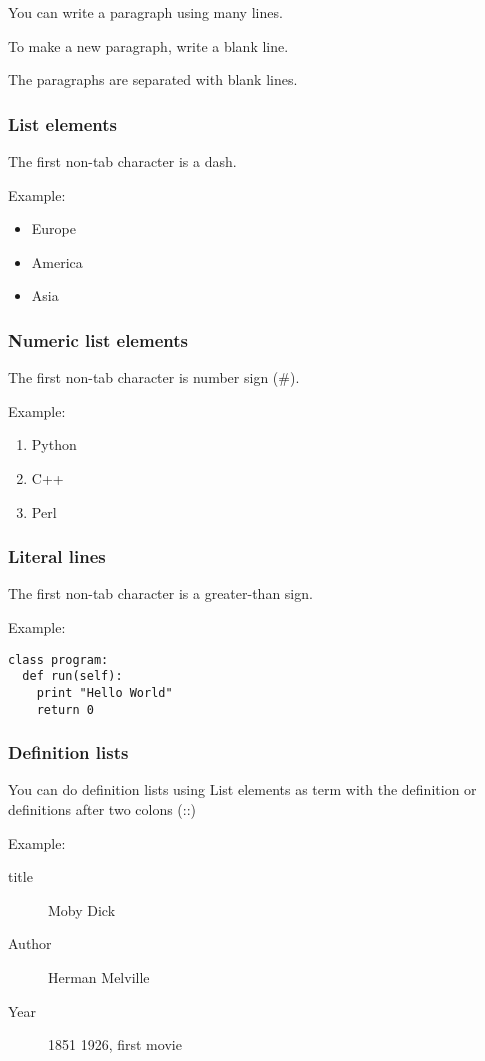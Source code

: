 \documentclass[a4paper,11pt]{article}
\begin{document}
You can write a paragraph using many lines. 

To make a new paragraph, write a blank line.

The paragraphs are separated with blank lines.

\subsubsection{List elements}
The first non-tab character is a dash.

Example:

\begin{itemize}
\item  Europe
\item  America
\item  Asia
\end{itemize}
\subsubsection{Numeric list elements}
The first non-tab character is number sign (#).

Example:

\begin{enumerate}
\item  Python
\item  C++
\item  Perl
\end{enumerate}
\subsubsection{Literal lines}
The first non-tab character is a greater-than sign.

Example:

\begin{verbatim}
class program:
  def run(self):
    print "Hello World"
    return 0
\end{verbatim}
\subsubsection{Definition lists}
You can do definition lists using List elements as term with the definition or definitions after two colons (::)

Example:

\begin{description}
\item[ title]
 Moby Dick
\item[ Author]
 Herman Melville
\item[ Year]
 1851
 1926, first movie
\end{description}
\end{document}
